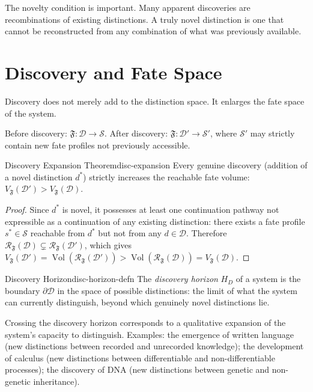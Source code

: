 \documentclass[12pt,twoside,openright]{book}
\newcommand{\Vol}{\operatorname{Vol}}     %
\newcommand{\distset}{\mathcal{D}}        %
\newcommand{\fateMap}{\mathfrak{F}}
\newcommand{\fateSpace}{\mathcal{S}}
\providecommand{\fateReach}[1]{\mathcal{R}_{\fateMap}(#1)}
\providecommand{\fateVol}[1]{V_{\fateMap}(#1)}
\providecommand{\discHorizon}{H_{D}}
\begin{document}
The novelty condition is important. Many apparent discoveries
are recombinations of existing distinctions. A truly novel
distinction is one that cannot be reconstructed from any
combination of what was previously available.

\section{Discovery and Fate Space}

Discovery does not merely add to the distinction space. It
enlarges the fate space of the system.

Before discovery: $\fateMap:\distset\to\fateSpace$.
After discovery: $\fateMap:\distset'\to\fateSpace'$, where
$\fateSpace'$ may strictly contain new fate profiles not
previously accessible.

\begin{theorem}{Discovery Expansion Theorem}{disc-expansion}
Every genuine discovery (addition of a novel distinction $d^*$)
strictly increases the reachable fate volume:
$\fateVol{\distset'} > \fateVol{\distset}$.
\begin{proof}
Since $d^*$ is novel, it possesses at least one continuation
pathway not expressible as a continuation of any existing
distinction: there exists a fate profile $s^*\in\fateSpace$
reachable from $d^*$ but not from any $d\in\distset$.
Therefore
$\fateReach{\distset}\subsetneq\fateReach{\distset'}$,
which gives
$\fateVol{\distset'}=\Vol(\fateReach{\distset'})>
\Vol(\fateReach{\distset})=\fateVol{\distset}$.
\end{proof}
\end{theorem}

\begin{definition}{Discovery Horizon}{disc-horizon-defn}
The \emph{discovery horizon} $\discHorizon$ of a system is
the boundary $\partial\distset$ in the space of possible
distinctions: the limit of what the system can currently
distinguish, beyond which genuinely novel distinctions lie.
\end{definition}

Crossing the discovery horizon corresponds to a qualitative
expansion of the system's capacity to distinguish. Examples:
the emergence of written language (new distinctions between
recorded and unrecorded knowledge); the development of
calculus (new distinctions between differentiable and
non-differentiable processes); the discovery of DNA (new
distinctions between genetic and non-genetic inheritance).
\end{document}
